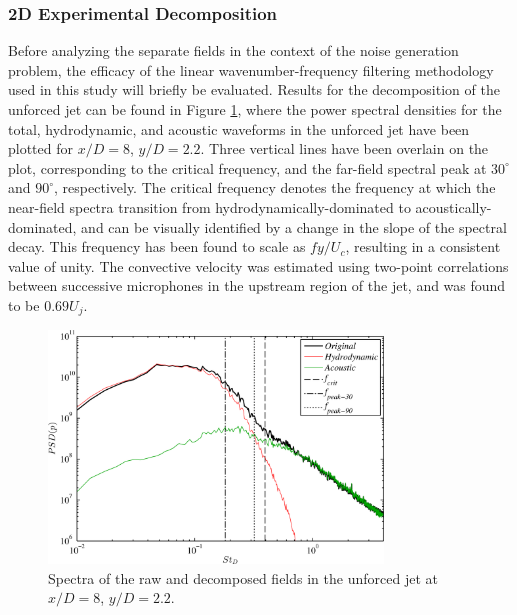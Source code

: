 \documentclass[english]{aiaa-tc}
\begin{document}
\subsubsection{2D Experimental Decomposition}
Before analyzing the separate fields in the context of the noise generation problem, the efficacy of the linear wavenumber-frequency filtering methodology used in this study will briefly be evaluated. Results for the decomposition of the unforced jet can be found in Figure \ref{waveletdecomp}, where the power spectral densities for the total, hydrodynamic, and acoustic waveforms in the unforced jet have been plotted for $x/D = 8$, $y/D = 2.2$. Three vertical lines have been overlain on the plot, corresponding to the critical frequency, and the far-field spectral peak at $30^{\circ}$ and $90^{\circ}$, respectively. The critical frequency denotes the frequency at which the near-field spectra transition from hydrodynamically-dominated to acoustically-dominated, and can be visually identified by a change in the slope of the spectral decay. This frequency has been found to scale as $fy/U_{c}$, resulting in a consistent value of unity\cite{sinha2013}. The convective velocity was estimated using two-point correlations between successive microphones in the upstream region of the jet, and was found to be $0.69U_{j}$.
\begin{figure}
\begin{center}
	\includegraphics[width=3.5in]{waveletdecomposition2D}
    \caption{Spectra of the raw and decomposed fields in the unforced jet at $x/D=8$, $y/D=2.2$.}\label{waveletdecomp}
\end{center}
\end{figure}
\end{document}
